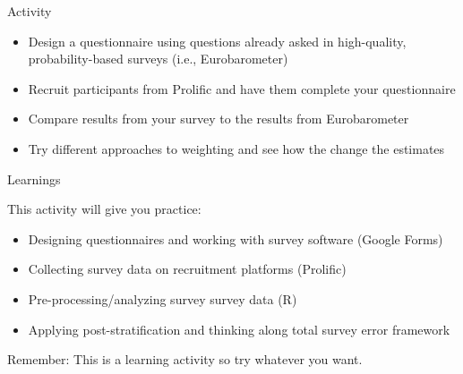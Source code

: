 \documentclass[aspectratio=169]{beamer}
\begin{document}
\begin{frame}{Activity}

\begin{itemize}
\item Design a questionnaire using questions already asked in high-quality, probability-based surveys (i.e., Eurobarometer)
\pause
\item Recruit participants from Prolific and have them complete your questionnaire  
\pause
\item Compare results from your survey to the results from Eurobarometer
\pause
\item Try different approaches to weighting and see how the change the estimates
\end{itemize}

\end{frame}
\begin{frame}{Learnings}

This activity will give you practice:
\begin{itemize}
\item Designing questionnaires and working with survey software (Google Forms)
\pause
\item Collecting survey data on recruitment platforms (Prolific)
\pause
\item Pre-processing/analyzing survey survey data (R)
\pause
\item Applying post-stratification and thinking along total survey error framework
\pause
\end{itemize}

\vfill
Remember: This is a learning activity so try whatever you want.

\end{frame}
\end{document}
